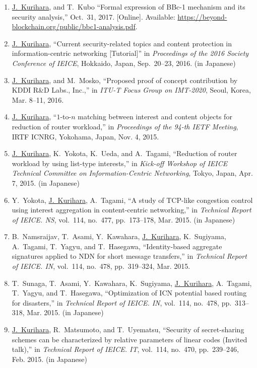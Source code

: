 \begin{enumerate}
 \item \underline{J.~Kurihara}, and T.~Kubo ``Formal expression of BBc-1 mechanism and its security analysis,'' Oct.~31, 2017. [Online]. Available: \url{https://beyond-blockchain.org/public/bbc1-analysis.pdf}.
 \item \underline{J.~Kurihara}, ``Current security-related topics and content protection in information-centric networking [Tutorial]'' in \textit{Proceedings of the 2016 Society Conference of IEICE}, Hokkaido, Japan, Sep.~20--23, 2016. (in Japanese)
 \item \underline{J.~Kurihara}, and M.~Mosko, ``Proposed proof of concept contribution by KDDI R\&D Labs., Inc.,'' in \textit{ITU-T Focus Group on IMT-2020}, Seoul, Korea, Mar. 8--11, 2016.
 \item \underline{J.~Kurihara}, ``$1$-to-$n$ matching between interest and content objects for reduction of router workload,'' in \textit{Proceedings of the 94-th IETF Meeting}, IRTF ICNRG, Yokohama, Japan, Nov. 4, 2015.
 \item \underline{J.~Kurihara}, K.~Yokota, K.~Ueda, and A.~Tagami, ``Reduction of router workload by using list-type interests,'' in \textit{Kick-off Workshop of IEICE Technical Committee on Information-Centric Networking}, Tokyo, Japan, Apr. 7, 2015. (in Japanese)
 \item Y.~Yokota, \underline{J.~Kurihara}, A.~Tagami, ``A study of TCP-like congestion control using interest aggregation in content-centric networking,'' in \textit{Technical Report of IEICE. NS}, vol.~114, no.~477, pp.~173--178, Mar. 2015. (in Japanese)
 \item B.~Namsraijav, T.~Asami, Y.~Kawahara, \underline{J.~Kurihara}, K.~Sugiyama, A.~Tagami, T.~Yagyu, and T.~Hasegawa, ``Identity-based aggregate signatures applied to NDN for short message transfers,'' in \textit{Technical Report of IEICE. IN}, vol.~114, no.~478, pp.~319--324, Mar. 2015.
 \item T.~Sunaga, T.~Asami, Y.~Kawahara, K.~Sugiyama, \underline{J.~Kurihara}, A.~Tagami, T.~Yagyu, and T.~Hasegawa, ``Optimization of ICN potential based routing for disasters,'' in \textit{Technical Report of IEICE. IN}, vol.~114, no.~478, pp.~313--318, Mar. 2015. (in Japanese)
 \item \underline{J.~Kurihara}, R.~Matsumoto, and T.~Uyematsu, ``Security of secret-sharing schemes can be characterized by relative parameters of linear codes (Invited talk),'' in \textit{Technical Report of IEICE. IT}, vol.~114, no.~470, pp.~239--246, Feb. 2015. (in Japanese)

\end{enumerate}
